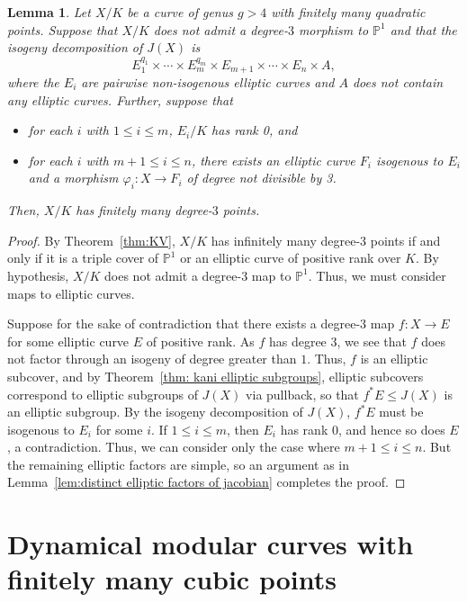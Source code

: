 \documentclass[12pt]{amsart}
\newtheorem{lem}[thm]{Lemma}
\theoremstyle{definition}
\renewcommand{\phi}{\varphi}
\numberwithin{equation}{section}
\begin{document}
\begin{lem}\label{lem:repeated elliptic factors of jacobian}
    Let $X/K$ be a curve of genus $g > 4$ with finitely many quadratic points. Suppose that $X/K$ does not admit a degree-$3$ morphism to $\mathbb{P}^1$ and that the isogeny decomposition of $J(X)$ is
        \[
        E_1^{q_1} \times \cdots \times E_{m}^{q_m} \times E_{m+1} \times \cdots \times E_{n} \times A,
        \]
    where the $E_i$ are pairwise non-isogenous elliptic curves and $A$ does not contain any elliptic curves. Further, suppose that
    \begin{itemize}
        \item for each $i$ with $1 \leq i \leq m$, $E_i/K$ has rank 0, and
        \item for each $i$ with $m+1 \leq i \leq n$, there exists an elliptic curve $F_i$ isogenous to $E_i$ and a morphism $\phi_i: X \to F_i$ of degree not divisible by 3.
    \end{itemize}
    Then, $X/K$ has finitely many degree-$3$ points.
\end{lem}
\begin{proof}
    By Theorem~\ref{thm:KV}, $X/K$ has infinitely many degree-$3$ points if and only if it is a triple cover of $\mathbb{P}^1$ or an elliptic curve of positive rank over $K$. By hypothesis, $X/K$ does not admit a degree-$3$ map to $\mathbb{P}^1$. Thus, we must consider maps to elliptic curves.
    
    Suppose for the sake of contradiction that there exists a degree-$3$ map $f: X \to E$ for some elliptic curve $E$ of positive rank. As $f$ has degree $3$, we see that $f$ does not factor through an isogeny of degree greater than $1$. Thus, $f$ is an elliptic subcover, and by Theorem~\ref{thm: kani elliptic subgroups}, elliptic subcovers correspond to elliptic subgroups of $J(X)$ via pullback, so that $f^*E \leq J(X)$ is an elliptic subgroup. By the isogeny decomposition of $J(X)$, $f^*E$ must be isogenous to $E_i$ for some $i$. If $1 \leq i \leq m$, then $E_i$ has rank 0, and hence so does $E$, a contradiction. Thus, we can consider only the case where $m+1 \leq i \leq n$.  But the remaining elliptic factors are simple, so an argument as in Lemma~\ref{lem:distinct elliptic factors of jacobian} completes the proof.
\end{proof}

\section{Dynamical modular curves with finitely many cubic points}\label{sec:DMCs-finitely-many}
\end{document}
